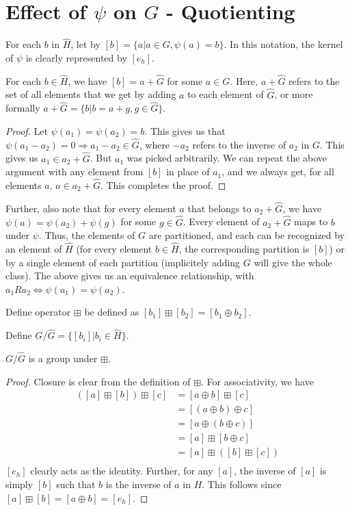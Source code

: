 \section{Effect of $\psi$ on $G$ - Quotienting}
For each $b$ in $\widehat{H}$, let by $[b] = \{ a|a \in G, \psi(a) = b \}$.
In this notation, the kernel of $\psi$ is clearly represented by $[e_{h}]$.
\begin{lemma} \label{lem:partition}
  For each $b \in \widehat{H}$, we have $[b] = a + \widehat{G}$ for some $a \in G$.
  Here, $a + \widehat{G}$ refers to the set of all elements that we get by adding $a$ to each element of $\widehat{G}$, or more formally $a + \widehat{G} = \{b|b=a+g, g \in \widehat{G} \}$.
\end{lemma}
\begin{proof}
  Let $\psi(a_{1}) = \psi(a_{2}) = b$.
  This gives us that $\psi(a_{1} - a_{2}) = 0 \Rightarrow a_{1} - a_{2} \in \widehat{G}$, where $-a_{2}$ refers to the inverse of $a_{2}$ in $G$.
  This gives us $a_{1} \in a_{2} + \widehat{G}$.
  But $a_{1}$ was picked arbitrarily.
  We can repeat the above argument with any element from $[b]$ in place of $a_{1}$, and we always get, for all elements $a$, $a \in a_{2} + \widehat{G}$.
  This completes the proof.
\end{proof}
Further, also note that for every element $a$ that belongs to $a_{2} + \widehat{G}$, we have $\psi(a) = \psi(a_{2}) + \psi(g)$ for some $g \in \widehat{G}$.
Every element of $a_{2} + \widehat{G}$ maps to $b$ under $\psi$.
Thus, the elements of $G$ are partitioned, and each can be recognized by an element of $\widehat{H}$ (for every element $b \in \widehat{H}$, the corresponding partition is $[b]$) or by a single element of each partition (implicitely adding $G$ will give the whole class).
The above gives us an equivalence relationship, with $a_{1} R a_{2} \Leftrightarrow \psi(a_{1}) = \psi(a_{2})$.
\par
Define operator $\boxplus$ be defined as $[b_{1}] \boxplus [b_{2}] = [b_{1} \oplus b_{2}]$.
\par
Define $G \Big/ \widehat{G} = \{ [b_{i}] | b_{i} \in \widehat{H} \}$.
\begin{lemma} \label{lem:quotientgroup}
  $G \Big/ \widehat{G}$ is a group under $\boxplus$.
\end{lemma}
\begin{proof}
  Closure is clear from the definition of $\boxplus$.
  For associativity, we have
  \begin{align*}
    ([a] \boxplus [b]) \boxplus[c] &= [a \oplus b] \boxplus [c] \\
    &= [(a \oplus b) \oplus c] \\
    &= [a \oplus (b \oplus c)] \\
    &= [a] \boxplus [b \oplus c] \\
    &= [a] \boxplus ([b] \boxplus [c]) \\
  \end{align*}
  $[e_{h}]$ clearly acts as the identity.
  Further, for any $[a]$, the inverse of $[a]$ is simply $[b]$ such that $b$ is the inverse of $a$ in $H$.
  This follows since $[a] \boxplus [b] = [a \oplus b] = [e_{h}]$.
\end{proof}
